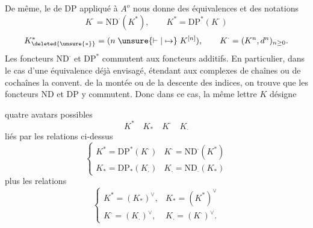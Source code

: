 De même, le  de $\mathrm{DP}$ appliqué à $A^o$ nous donne des équivalences
et des notations
\[
 K^{\cdot}=\mathrm{ND}^{\cdot}(K^*),\qquad K^*=\mathrm{DP}^*(K^{\cdot})
\]
\[
 K^{*}_{\deleted{\unsure{*}}}=(n\mathrel{\unsure{\vdash|\mapsto}}K^{[n]}),\qquad
 K^{\cdot}=(K^n,d^n)_{n\geq0}.
\]
Les foncteurs $\mathrm{ND}^{\cdot}$ et $\mathrm{DP}^*$ commutent aux foncteurs additifs.
En particulier, dans le cas d'une équivalence
déjà envisagé, étendant aux complexes de chaînes ou de cochaînes la convent.
de la montée ou de la descente des indices, on trouve que les foncteurs
$\mathrm{ND}$ et $\mathrm{DP}$ y commutent. Donc dans ce cas, la même lettre $K$ désigne

quatre avatars possibles
\[
 K^*\quad K_*\quad K^{\cdot}\quad K_{\cdot}
\]
liés par les relations ci-dessus
\[
 \left\{\begin{array}{ll}
 K^*=\mathrm{DP}^*(K^{\cdot})&K^{\cdot}=\mathrm{ND}^{\cdot}(K^*)\\
 K_*=\mathrm{DP}_*(K_{\cdot})&K_{\cdot}=\mathrm{ND}_{\cdot}(K_*)
 \end{array}\right.
\]
plus les relations
\[
 \left\{\begin{array}{ll}
 K^*=(K_*)^\vee,&K_*=(K^*)^\vee\\
 K^{\cdot}=(K_{\cdot})^\vee,&K_{\cdot}=(K^{\cdot})^\vee.
 \end{array}\right.
\]

